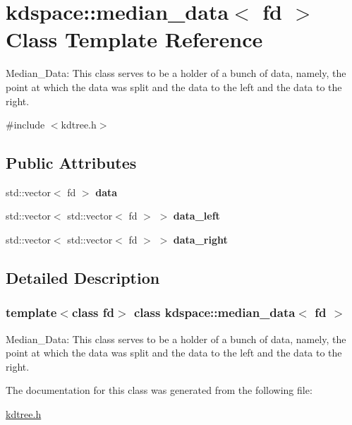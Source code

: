 \hypertarget{classkdspace_1_1median__data}{}\section{kdspace\+:\+:median\+\_\+data$<$ fd $>$ Class Template Reference}
\label{classkdspace_1_1median__data}


Median\+\_\+\+Data\+: This class serves to be a holder of a bunch of data, namely, the point at which the data was split and the data to the left and the data to the right.  




{\ttfamily \#include $<$kdtree.\+h$>$}

\subsection*{Public Attributes}
\begin{DoxyCompactItemize}
\item 
\mbox{\label{classkdspace_1_1median__data_a9a41462b5c13293ee2d547ae85d2215e}} 
std\+::vector$<$ fd $>$ {\bfseries data}
\item 
\mbox{\label{classkdspace_1_1median__data_aed7ddade6ee2f24873de366059301a4f}} 
std\+::vector$<$ std\+::vector$<$ fd $>$ $>$ {\bfseries data\+\_\+left}
\item 
\mbox{\label{classkdspace_1_1median__data_ab79689b91618831f957372b0af7fd298}} 
std\+::vector$<$ std\+::vector$<$ fd $>$ $>$ {\bfseries data\+\_\+right}
\end{DoxyCompactItemize}


\subsection{Detailed Description}
\subsubsection*{template$<$class fd$>$\newline
class kdspace\+::median\+\_\+data$<$ fd $>$}

Median\+\_\+\+Data\+: This class serves to be a holder of a bunch of data, namely, the point at which the data was split and the data to the left and the data to the right. 

The documentation for this class was generated from the following file\+:\begin{DoxyCompactItemize}
\item 
\hyperlink{kdtree_8h}{kdtree.\+h}\end{DoxyCompactItemize}
